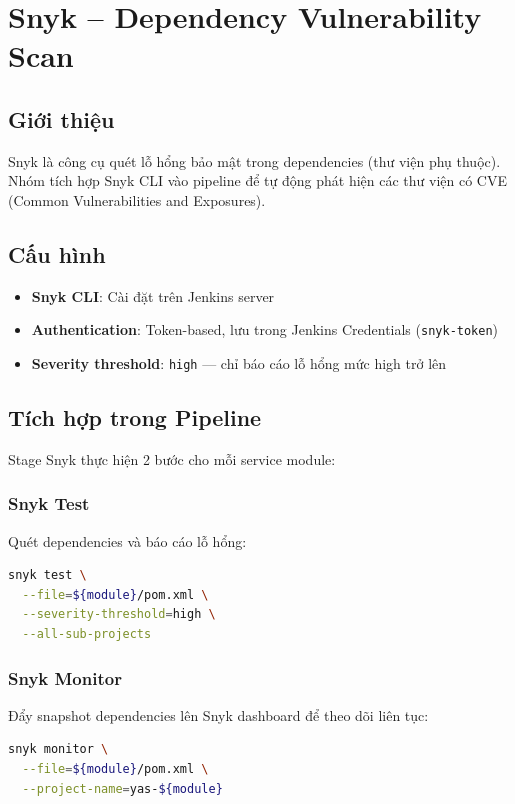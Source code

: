 \section{Snyk -- Dependency Vulnerability Scan}
\label{sec:snyk}

\subsection{Giới thiệu}
Snyk là công cụ quét lỗ hổng bảo mật trong dependencies (thư viện phụ thuộc). Nhóm tích hợp Snyk CLI vào pipeline để tự động phát hiện các thư viện có CVE (Common Vulnerabilities and Exposures).

\subsection{Cấu hình}
\begin{itemize}[noitemsep]
    \item \textbf{Snyk CLI}: Cài đặt trên Jenkins server
    \item \textbf{Authentication}: Token-based, lưu trong Jenkins Credentials (\texttt{snyk-token})
    \item \textbf{Severity threshold}: \texttt{high} --- chỉ báo cáo lỗ hổng mức high trở lên
\end{itemize}

\subsection{Tích hợp trong Pipeline}
Stage Snyk thực hiện 2 bước cho mỗi service module:

\subsubsection{Snyk Test}
Quét dependencies và báo cáo lỗ hổng:
\begin{lstlisting}[language=bash, caption={Snyk Test command}]
snyk test \
  --file=${module}/pom.xml \
  --severity-threshold=high \
  --all-sub-projects
\end{lstlisting}

\subsubsection{Snyk Monitor}
Đẩy snapshot dependencies lên Snyk dashboard để theo dõi liên tục:
\begin{lstlisting}[language=bash, caption={Snyk Monitor command}]
snyk monitor \
  --file=${module}/pom.xml \
  --project-name=yas-${module}
\end{lstlisting}

